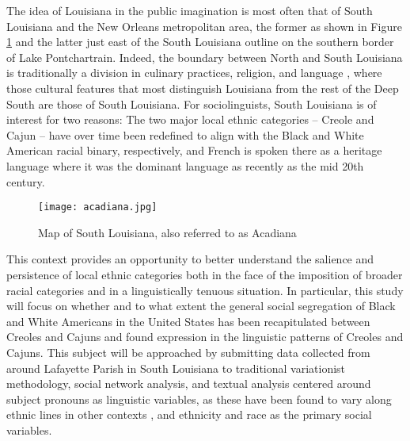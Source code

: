   The idea of Louisiana in the public imagination is most often that of South Louisiana and the New Orleans metropolitan area, the former as shown in Figure \ref{fig:south_la} and the latter just east of the South Louisiana outline on the southern border of Lake Pontchartrain.
  Indeed, the boundary between North and South Louisiana is traditionally a division in culinary practices, religion, and language \parencite[p.~309]{trepanier_french_1988}, where those cultural features that most distinguish Louisiana from the rest of the Deep South are those of South Louisiana.
  For sociolinguists, South Louisiana is of interest for two reasons: The two major local ethnic categories -- Creole and Cajun -- have over time been redefined to align with the Black and White American racial binary, respectively, and French is spoken there as a heritage language where it was the dominant language as recently as the mid 20th century.

  \begin{figure}[tbhp]
    \centering
    \caption{Map of South Louisiana, also referred to as Acadiana}
    \label{fig:south_la}
    \texttt{[image: acadiana.jpg]}
  \end{figure}

  This context provides an opportunity to better understand the salience and persistence of local ethnic categories both in the face of the imposition of broader racial categories and in a linguistically tenuous situation.
  In particular, this study will focus on whether and to what extent the general social segregation of Black and White Americans in the United States \parencite{smith_social_2014} has been recapitulated between Creoles and Cajuns and found expression in the linguistic patterns of Creoles and Cajuns.
  This subject will be approached by submitting data collected from around Lafayette Parish in South Louisiana to traditional variationist methodology, social network analysis, and textual analysis centered around subject pronouns as linguistic variables, as these have been found to vary along ethnic lines in other contexts \parencite{dajko_ethnic_2009, rottet_language_1995}, and ethnicity and race as the primary social variables.

